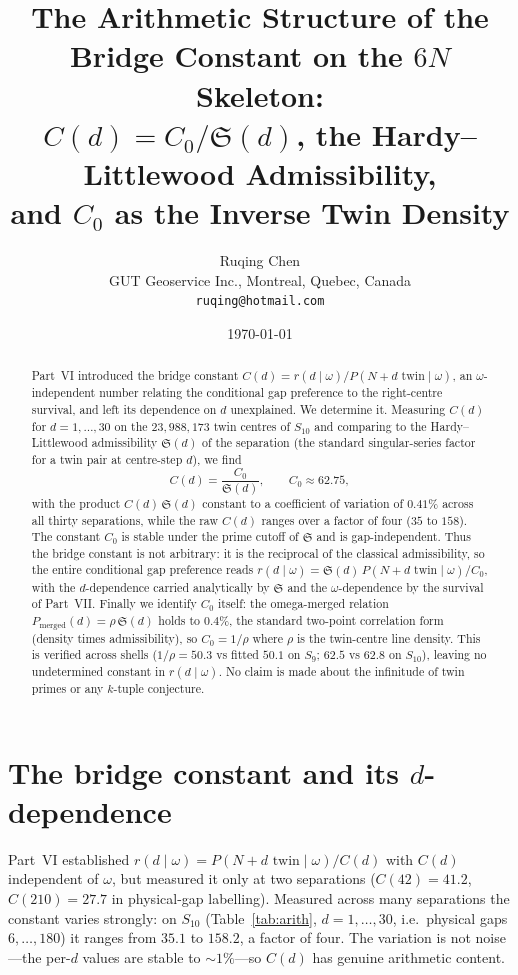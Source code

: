 \documentclass[11pt]{article}
\title{The Arithmetic Structure of the Bridge Constant on the $6N$ Skeleton:\\
$C(d)=C_0/\mathfrak{S}(d)$, the Hardy--Littlewood Admissibility,\\ and $C_0$ as the Inverse Twin Density}
\author{Ruqing Chen\\
\small GUT Geoservice Inc., Montreal, Quebec, Canada\\
\small \texttt{ruqing@hotmail.com}}
\date{\today}
\begin{document}
\maketitle

\begin{abstract}
Part~VI introduced the bridge constant $C(d)=r(d\mid\omega)/P(N{+}d\text{ twin}
\mid\omega)$, an $\omega$-independent number relating the conditional gap
preference to the right-centre survival, and left its dependence on $d$
unexplained. We determine it. Measuring $C(d)$ for $d=1,\dots,30$ on the
$23{,}988{,}173$ twin centres of $S_{10}$ and comparing to the Hardy--Littlewood
admissibility $\mathfrak{S}(d)$ of the separation (the standard singular-series
factor for a twin pair at centre-step $d$), we find
\[
  C(d)=\frac{C_0}{\mathfrak{S}(d)},\qquad C_0\approx 62.75,
\]
with the product $C(d)\,\mathfrak{S}(d)$ constant to a coefficient of variation
of $0.41\%$ across all thirty separations, while the raw $C(d)$ ranges over a
factor of four ($35$ to $158$). The constant $C_0$ is stable under the
prime cutoff of $\mathfrak{S}$ and is gap-independent. Thus the bridge constant
is not arbitrary: it is the reciprocal of the classical admissibility, so the
entire conditional gap preference reads
$r(d\mid\omega)=\mathfrak{S}(d)\,P(N{+}d\text{ twin}\mid\omega)/C_0$, with the
$d$-dependence carried analytically by $\mathfrak{S}$ and the $\omega$-dependence
by the survival of Part~VII. Finally we identify $C_0$ itself: the omega-merged
relation $P_{\mathrm{merged}}(d)=\rho\,\mathfrak{S}(d)$ holds to $0.4\%$, the
standard two-point correlation form (density times admissibility), so
$C_0=1/\rho$ where $\rho$ is the twin-centre line density. This is verified across
shells ($1/\rho=50.3$ vs fitted $50.1$ on $S_9$; $62.5$ vs $62.8$ on $S_{10}$),
leaving no undetermined constant in $r(d\mid\omega)$. No claim is made about the
infinitude of twin primes or any $k$-tuple conjecture.
\end{abstract}

\section{The bridge constant and its $d$-dependence}

Part~VI established $r(d\mid\omega)=P(N{+}d\text{ twin}\mid\omega)/C(d)$ with
$C(d)$ independent of $\omega$, but measured it only at two separations
($C(42)=41.2$, $C(210)=27.7$ in physical-gap labelling). Measured across many
separations the constant varies strongly: on $S_{10}$ (Table~\ref{tab:arith},
$d=1,\dots,30$, i.e.\ physical gaps $6,\dots,180$) it ranges from $35.1$ to
$158.2$, a factor of four. The variation is not noise---the per-$d$ values are
stable to $\sim1\%$---so $C(d)$ has genuine arithmetic content.
\end{document}
